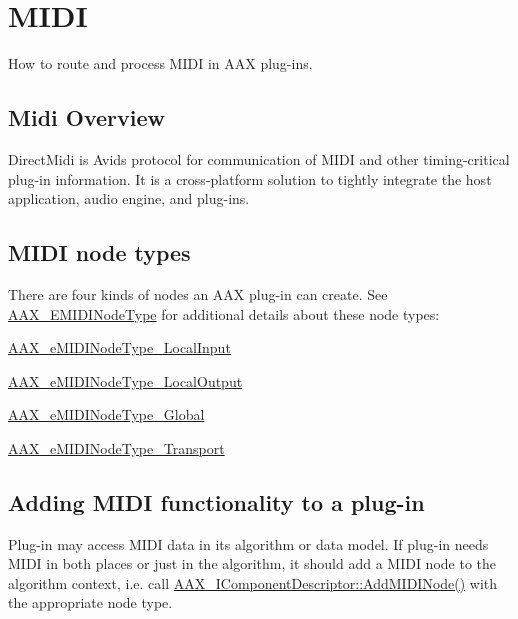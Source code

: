 \hypertarget{a00336}{}\section{M\+I\+D\+I}
\label{a00336}
How to route and process M\+I\+D\+I in A\+A\+X plug-\/ins. 

\hypertarget{a00336_additionalFeatures_MIDI_Overview}{}\subsection{Midi Overview}\label{a00336_additionalFeatures_MIDI_Overview}
Direct\+Midi is Avid\textquotesingle{}s protocol for communication of M\+I\+D\+I and other timing-\/critical plug-\/in information. It is a cross-\/platform solution to tightly integrate the host application, audio engine, and plug-\/ins.\hypertarget{a00336_additionalFeatures_MIDI_NodeTypes}{}\subsection{M\+I\+D\+I node types}\label{a00336_additionalFeatures_MIDI_NodeTypes}
There are four kinds of nodes an A\+A\+X plug-\/in can create. See \hyperlink{a00206_a5e1dffce35d05990dbbad651702678e4}{A\+A\+X\+\_\+\+E\+M\+I\+D\+I\+Node\+Type} for additional details about these node types\+: \begin{DoxyItemize}
\item \hyperlink{a00206_a5e1dffce35d05990dbbad651702678e4ae57de2b04978fe2e75f5bdeb034bda44}{A\+A\+X\+\_\+e\+M\+I\+D\+I\+Node\+Type\+\_\+\+Local\+Input} \item \hyperlink{a00206_a5e1dffce35d05990dbbad651702678e4acc1b5f2109c508b20a65b5e0fdcd643f}{A\+A\+X\+\_\+e\+M\+I\+D\+I\+Node\+Type\+\_\+\+Local\+Output} \item \hyperlink{a00206_a5e1dffce35d05990dbbad651702678e4a2be91828f8c1dac20ab5dff136fc1fce}{A\+A\+X\+\_\+e\+M\+I\+D\+I\+Node\+Type\+\_\+\+Global} \item \hyperlink{a00206_a5e1dffce35d05990dbbad651702678e4ac2ff856aec0724907dfd95b8e3ccbc20}{A\+A\+X\+\_\+e\+M\+I\+D\+I\+Node\+Type\+\_\+\+Transport}\end{DoxyItemize}
\hypertarget{a00336_additionalFeatures_MIDI_AddingMIDI}{}\subsection{Adding M\+I\+D\+I functionality to a plug-\/in}\label{a00336_additionalFeatures_MIDI_AddingMIDI}
Plug-\/in may access M\+I\+D\+I data in its algorithm or data model. If plug-\/in needs M\+I\+D\+I in both places or just in the algorithm, it should add a M\+I\+D\+I node to the algorithm context, i.\+e. call \hyperlink{a00088_a6284dda9ccca898e33075de29dad4e39}{A\+A\+X\+\_\+\+I\+Component\+Descriptor\+::\+Add\+M\+I\+D\+I\+Node()} with the appropriate node type.


